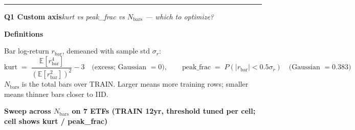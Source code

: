 \documentclass[11pt]{article}
\newcommand{\qhead}[2]{%
  \par\vspace{4pt}\noindent\rule{\linewidth}{0.5pt}\par\vspace{1pt}%
  \noindent\textbf{\large #1}\quad\textit{#2}\par\vspace{4pt}}
\newcommand{\shead}[1]{\par\vspace{4pt}\noindent\textbf{\normalsize #1}\par\vspace{1pt}}
\begin{document}
\newpage

\qhead{Q1 \enspace Custom axis}{kurt vs peak\_frac vs $N_{\mathrm{bars}}$ --- which to optimize?}

\shead{Definitions}

Bar log-return $r_{\mathrm{bar}}$, demeaned with sample std $\sigma_r$:
\[ \mathrm{kurt} \;=\; \frac{\mathbb{E}[r_{\mathrm{bar}}^4]}{(\mathbb{E}[r_{\mathrm{bar}}^2])^2} - 3 \quad\text{(excess; Gaussian $=0$)}, \qquad
   \mathrm{peak\_frac} \;=\; P(|r_{\mathrm{bar}}| < 0.5\sigma_r) \quad\text{(Gaussian $=0.383$)} \]
$N_{\mathrm{bars}}$ is the total bars over TRAIN. Larger means more training rows; smaller means thinner bars closer to IID.

\shead{Sweep across $N_{\mathrm{bars}}$ on 7 ETFs (TRAIN 12yr, threshold tuned per cell; cell shows kurt / peak\_frac)}
\end{document}
